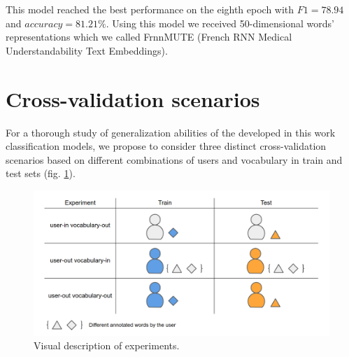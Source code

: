 

This model reached the best performance on the eighth epoch  with $F1= 78.94$ and $accuracy =
81.21\%$. Using this model we received 50-dimensional words' representations which we called FrnnMUTE (French RNN Medical Understandability Text Embeddings). 


\section{Cross-validation scenarios}
For a thorough study of generalization abilities of the developed in this work classification models, we propose to consider three distinct cross-validation scenarios based on different combinations of users and vocabulary in train and test sets (fig. \ref{fig:experiments-description}).

\begin{figure}[h]
    \centering
    \includegraphics[width=14cm]{Images/Experiments.png}
    \caption{Visual description of experiments.}
    \label{fig:experiments-description}
\end{figure} 

